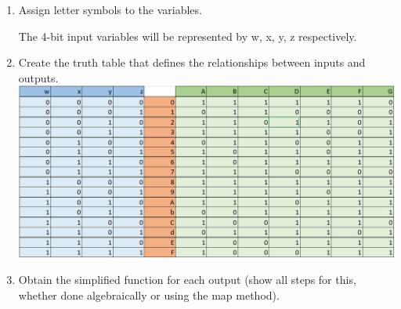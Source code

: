 \documentclass{article}
\begin{document}
\begin{enumerate}[label=\arabic*]
    \vspace{3 mm}
    \item Assign letter symbols to the variables.
    \vspace{1 mm}
    
    The 4-bit input variables will be represented by w, x, y, z respectively.
    
    
    \newpage
    \item Create the truth table that defines the relationships between inputs and outputs. \\
    
    \includegraphics[scale=0.325]{TruthTable.PNG}

    \vspace{3 mm}
    \item Obtain the simplified function for each output (show all steps for this, whether done algebraically or using the map method). \\


    \newcommand{\implicantsol}[3][0]{
        \draw[rounded corners=3pt] ($(#2.north west)+(135:#1)$) rectangle ($(#2.south east)+(-45:#1)$);
    }

    \newcommand{\implicant}[4][0]{
        \draw[rounded corners=3pt] ($(#2.north west)+(135:#1)$) rectangle ($(#3.south east)+(-45:#1)$);
        }


\end{enumerate}
\end{document}

